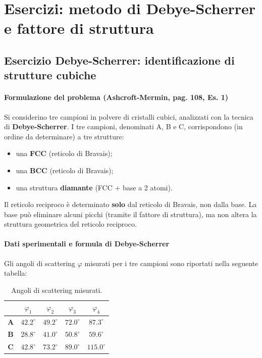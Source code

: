 \chapter{Esercizi: metodo di Debye-Scherrer e fattore di struttura}


\section{Esercizio Debye-Scherrer: identificazione di strutture cubiche}

\subsubsection{Formulazione del problema (Ashcroft-Mermin, pag. 108, Es. 1)}

Si considerino tre campioni in polvere di cristalli cubici, analizzati con la tecnica di \textbf{Debye-Scherrer}. I tre campioni, denominati A, B e C, corrispondono (in ordine da determinare) a tre strutture:
\begin{itemize}
    \item una \textbf{FCC} (reticolo di Bravais);
    \item una \textbf{BCC} (reticolo di Bravais);
    \item una struttura \textbf{diamante} (FCC + base a 2 atomi).
\end{itemize}

\begin{nota}
    Il reticolo reciproco è determinato \textbf{solo} dal reticolo di Bravais, non dalla base. La base può eliminare alcuni picchi (tramite il fattore di struttura), ma non altera la struttura geometrica del reticolo reciproco.
\end{nota}

\subsubsection{Dati sperimentali e formula di Debye-Scherrer}

Gli angoli di scattering $\varphi$ misurati per i tre campioni sono riportati nella seguente tabella:

\begin{table}[h!]
    \centering
    \begin{tabular}{|c|c|c|c|c|}
        \hline
        & $\varphi_1$ & $\varphi_2$ & $\varphi_3$ & $\varphi_4$ \\ \hline
        \textbf{A} & $42.2^\circ$ & $49.2^\circ$ & $72.0^\circ$ & $87.3^\circ$ \\ \hline
        \textbf{B} & $28.8^\circ$ & $41.0^\circ$ & $50.8^\circ$ & $59.6^\circ$ \\ \hline
        \textbf{C} & $42.8^\circ$ & $73.2^\circ$ & $89.0^\circ$ & $115.0^\circ$ \\ \hline
    \end{tabular}
    \caption{Angoli di scattering misurati.}
\end{table}

